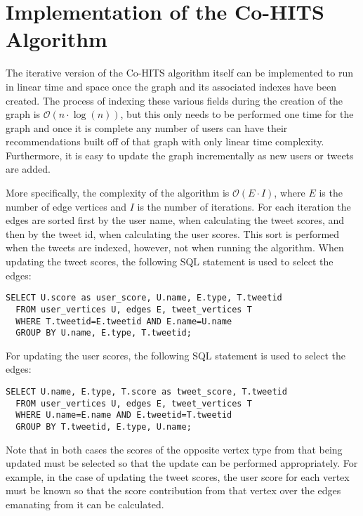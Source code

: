 \section{Implementation of the Co-HITS Algorithm}


The iterative version of the Co-HITS algorithm itself can be implemented to run in linear time and space once the graph and its associated indexes have been created. The process of indexing these various fields during the creation of the graph is $\mathcal{O}(n \cdot \log(n))$, but this only needs to be performed one time for the graph and once it is complete any number of users can have their recommendations built off of that graph with only linear time complexity. Furthermore, it is easy to update the graph incrementally as new users or tweets are added.

More specifically, the complexity of the algorithm is $\mathcal{O}(E \cdot I)$, where $E$ is the number of edge vertices and $I$ is the number of iterations. For each iteration the edges are sorted first by the user name, when calculating the tweet scores, and then by the tweet id, when calculating the user scores. This sort is performed when the tweets are indexed, however, not when running the algorithm. When updating the tweet scores, the following SQL statement is used to select the edges:

\begin{verbatim}
SELECT U.score as user_score, U.name, E.type, T.tweetid
  FROM user_vertices U, edges E, tweet_vertices T
  WHERE T.tweetid=E.tweetid AND E.name=U.name
  GROUP BY U.name, E.type, T.tweetid;
\end{verbatim}

\noindent
For updating the user scores, the following SQL statement is used to select the edges:

\begin{verbatim}
SELECT U.name, E.type, T.score as tweet_score, T.tweetid
  FROM user_vertices U, edges E, tweet_vertices T
  WHERE U.name=E.name AND E.tweetid=T.tweetid
  GROUP BY T.tweetid, E.type, U.name;
\end{verbatim}

\noindent
Note that in both cases the scores of the opposite vertex type from that being updated must be selected so that the update can be performed appropriately. For example, in the case of updating the tweet scores, the user score for each vertex must be known so that the score contribution from that vertex over the edges emanating from it can be calculated.

